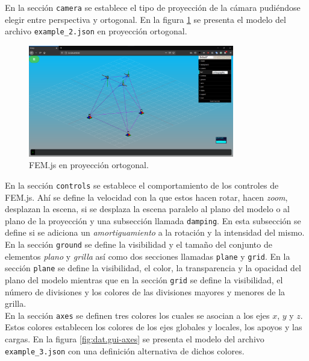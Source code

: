 
En la sección \verb|camera| se establece el tipo de proyección de la cámara pudiéndose elegir entre perspectiva y ortogonal. En la figura \ref{fig:dat.gui-camera} se presenta el modelo del archivo \verb|example_2.json| en proyección ortogonal.\\

\begin{figure}[ht]
  \centering
  \includegraphics[width=0.8\textwidth]{introduction/dat-gui-camera.png}
  \caption{FEM.js en proyección ortogonal.}
  \label{fig:dat.gui-camera}
\end{figure}

En la sección \verb|controls| se establece el comportamiento de los controles de FEM.js. Ahí se define la velocidad con la que estos hacen rotar, hacen \emph{zoom}, desplazan la escena, si se desplaza la escena paralelo al plano del modelo o al plano de la proyección y una subsección llamada \verb|damping|. En esta subsección se define si se adiciona un \emph{amortiguamiento} a la rotación y la intensidad del mismo.\\

En la sección \verb|ground| se define la visibilidad y el tamaño del conjunto de elementos \emph{plano} y \emph{grilla} así como dos secciones llamadas \verb|plane| y \verb|grid|. En la sección \verb|plane| se define la visibilidad, el color, la transparencia y la opacidad del plano del modelo mientras que en la sección \verb|grid| se define la visibilidad, el número de divisiones y los colores de las divisiones mayores y menores de la grilla.\\

En la sección \verb|axes| se definen tres colores los cuales se asocian a los ejes $ x $, $ y $ y $ z $. Estos colores establecen los colores de los ejes globales y locales, los apoyos y las cargas. En la figura \ref{fig:dat.gui-axes} se presenta el modelo del archivo \verb|example_3.json| con una definición alternativa de dichos colores.\\


